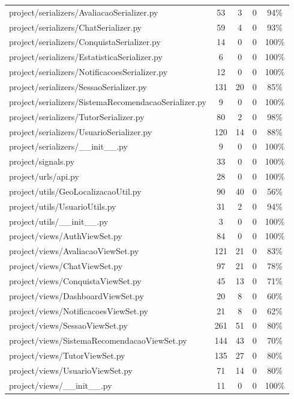 \begin{landscape}
\begin{longtable}{lcccc}
    project/serializers/AvaliacaoSerializer.py & 53 & 3 & 0 & 94\% \\
    project/serializers/ChatSerializer.py & 59 & 4 & 0 & 93\% \\
    project/serializers/ConquistaSerializer.py & 14 & 0 & 0 & 100\% \\
    project/serializers/EstatisticaSerializer.py & 6 & 0 & 0 & 100\% \\
    project/serializers/NotificacoesSerializer.py & 12 & 0 & 0 & 100\% \\
    project/serializers/SessaoSerializer.py & 131 & 20 & 0 & 85\% \\
    project/serializers/SistemaRecomendacaoSerializer.py & 9 & 0 & 0 & 100\% \\
    project/serializers/TutorSerializer.py & 80 & 2 & 0 & 98\% \\
    project/serializers/UsuarioSerializer.py & 120 & 14 & 0 & 88\% \\
    project/serializers/\_\_init\_\_.py & 9 & 0 & 0 & 100\% \\
    project/signals.py & 33 & 0 & 0 & 100\% \\
    project/urls/api.py & 28 & 0 & 0 & 100\% \\
    project/utils/GeoLocalizacaoUtil.py & 90 & 40 & 0 & 56\% \\
    project/utils/UsuarioUtils.py & 31 & 2 & 0 & 94\% \\
    project/utils/\_\_init\_\_.py & 3 & 0 & 0 & 100\% \\
    project/views/AuthViewSet.py & 84 & 0 & 0 & 100\% \\
    project/views/AvaliacaoViewSet.py & 121 & 21 & 0 & 83\% \\
    project/views/ChatViewSet.py & 97 & 21 & 0 & 78\% \\
    project/views/ConquistaViewSet.py & 45 & 13 & 0 & 71\% \\
    project/views/DashboardViewSet.py & 20 & 8 & 0 & 60\% \\
    project/views/NotificacoesViewSet.py & 21 & 8 & 0 & 62\% \\
    project/views/SessaoViewSet.py & 261 & 51 & 0 & 80\% \\
    project/views/SistemaRecomendacaoViewSet.py & 144 & 43 & 0 & 70\% \\
    project/views/TutorViewSet.py & 135 & 27 & 0 & 80\% \\
    project/views/UsuarioViewSet.py & 71 & 14 & 0 & 80\% \\
    project/views/\_\_init\_\_.py & 11 & 0 & 0 & 100\% \\

\end{longtable}
\end{landscape}
